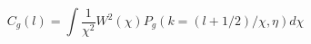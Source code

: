 \begin{equation}
 	C_g(l) =\int \frac{1}{\chi^2}W^2(\chi)P_g(k=(l+1/2)/\chi,\eta) d\chi
\end{equation} 




